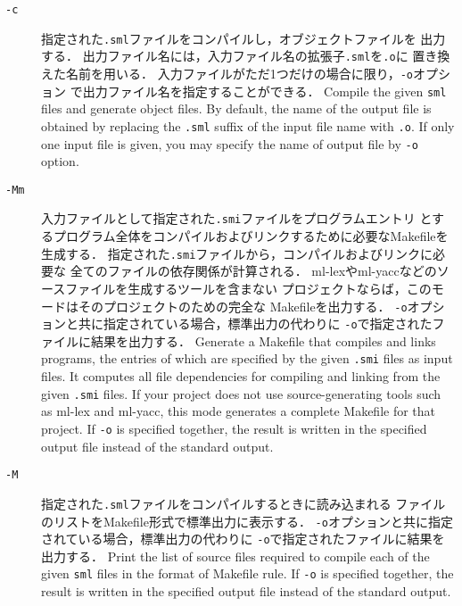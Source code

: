 \documentclass{jbook}
\begin{document}
\begin{description}
\item[{\tt -c}]
\ifjp%
	指定された{\tt .sml}ファイルをコンパイルし，オブジェクトファイルを
出力する．
	出力ファイル名には，入力ファイル名の拡張子{\tt .sml}を{\tt .o}に
置き換えた名前を用いる．
	入力ファイルがただ1つだけの場合に限り，{\tt -o}オプション
で出力ファイル名を指定することができる．
\else%
	Compile the given {\tt sml} files and generate object files.
	By default,
the name of the output file is obtained by replacing the {\tt .sml}
suffix of the input file name with {\tt .o}.
	If only one input file is given,
you may specify the name of output file by {\tt -o} option.
\fi%

\item[{\tt -Mm}]
\ifjp%
        入力ファイルとして指定された{\tt .smi}ファイルをプログラムエントリ
とするプログラム全体をコンパイルおよびリンクするために必要なMakefileを
生成する．
	指定された{\tt .smi}ファイルから，コンパイルおよびリンクに必要な
全てのファイルの依存関係が計算される．
	ml-lexやml-yaccなどのソースファイルを生成するツールを含まない
プロジェクトならば，このモードはそのプロジェクトのための完全な
Makefileを出力する．
	{\tt -o}オプションと共に指定されている場合，標準出力の代わりに
{\tt -o}で指定されたファイルに結果を出力する．
\else%
	Generate a Makefile that compiles and links programs,
the entries of which are specified by the given {\tt .smi} files as
input files.
	It computes all file dependencies for compiling and linking
from the given {\tt .smi} files.
	If your project does not use source-generating tools such as
ml-lex and ml-yacc, this mode generates a complete Makefile for that
project.
	If {\tt -o} is specified together,
the result is written in the specified output file instead of the
standard output.
\fi%

\item[{\tt -M}]
\ifjp%
	指定された{\tt .sml}ファイルをコンパイルするときに読み込まれる
ファイルのリストをMakefile形式で標準出力に表示する．
	{\tt -o}オプションと共に指定されている場合，標準出力の代わりに
{\tt -o}で指定されたファイルに結果を出力する．
\else%
	Print the list of source files required to compile each of the
given {\tt sml} files in the format of Makefile rule.
	If {\tt -o} is specified together,
the result is written in the specified output file instead of the
standard output.
\fi%


\end{description}
\end{document}
